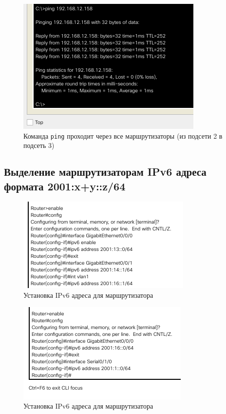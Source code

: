 \documentclass[12pt]{report}
\begin{document}
\begin{figure}[H]
	\begin{center}
		\includegraphics[scale=0.75]{img/9.png}
	\end{center}
	\caption{Команда \texttt{ping} проходит через все маршрутизаторы (из подсети 2 в подсеть 3)}
	\label{fig:9}
\end{figure}

\subsection*{Выделение маршрутизаторам IPv6 адреса формата 2001:x+y::z/64}

\begin{figure}[H]
	\begin{center}
		\includegraphics[scale=0.8]{img/10.png}
	\end{center}
	\caption{Установка IPv6 адреса для маршрутизатора}
	\label{fig:10}
\end{figure}

\begin{figure}[H]
	\begin{center}
		\includegraphics[scale=0.8]{img/11.png}
	\end{center}
	\caption{Установка IPv6 адреса для маршрутизатора}
	\label{fig:11}
\end{figure}
\end{document}
